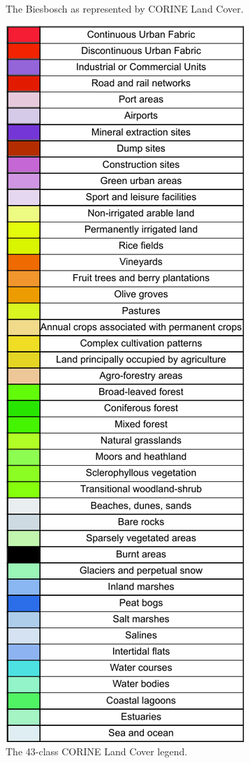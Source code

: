 \begin{figure}[H]
\begin{minipage}{0.5\textwidth}
                \caption{The Biesbosch as represented by CORINE Land Cover.}
            \end{minipage}
            \hfill
            \begin{minipage}{0.49\textwidth}
                \centering
                \includegraphics[width=\linewidth,height=2.15\textwidth,keepaspectratio]{figs_01/corine_legend.pdf}
                \caption{The 43-class CORINE Land Cover legend.}
                \label{fig:biesbosch_osm_clc}
            \end{minipage}
            \label{fig:two_column_layout}
        \end{figure}

